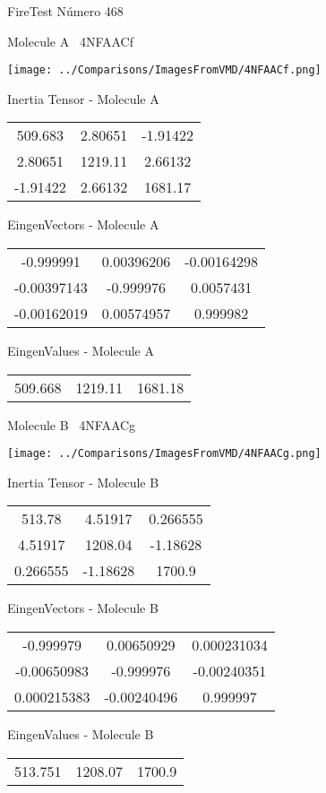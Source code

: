 \vtab[-3cm]
\begin{center}
{\large FireTest \tab Número 468}
\end{center}
\begin{multicols}{2}
\begin{center}

Molecule A \
4NFAACf

\texttt{[image: ../Comparisons/ImagesFromVMD/4NFAACf.png]}

Inertia Tensor - Molecule A \\
\begin{tabular}{|c c c|}
509.683	 & 	2.80651	 & 	-1.91422	 \\
2.80651	 & 	1219.11	 & 	2.66132	 \\
-1.91422	 & 	2.66132	 & 	1681.17
\end{tabular}

\vtab
 EingenVectors - Molecule A     \\
\begin{tabular}{|c c c|}
-0.999991	 & 	0.00396206	 & 	-0.00164298	 \\
-0.00397143	 & 	-0.999976	 & 	0.0057431	 \\
-0.00162019	 & 	0.00574957	 & 	0.999982
\end{tabular}

\vtab
 EingenValues - Molecule A     \\
\begin{tabular}{|c c c|}
509.668	 & 	1219.11	 & 	1681.18	 \\
\end{tabular}
\columnbreak

Molecule B \
4NFAACg

\texttt{[image: ../Comparisons/ImagesFromVMD/4NFAACg.png]}

Inertia Tensor - Molecule B \\
\begin{tabular}{|c c c|}
513.78	 & 	4.51917	 & 	0.266555	 \\
4.51917	 & 	1208.04	 & 	-1.18628	 \\
0.266555	 & 	-1.18628	 & 	1700.9
\end{tabular}

\vtab
 EingenVectors - Molecule B     \\
\begin{tabular}{|c c c|}
-0.999979	 & 	0.00650929	 & 	0.000231034	 \\
-0.00650983	 & 	-0.999976	 & 	-0.00240351	 \\
0.000215383	 & 	-0.00240496	 & 	0.999997
\end{tabular}

\vtab
 EingenValues - Molecule B     \\
\begin{tabular}{|c c c|}
513.751	 & 	1208.07	 & 	1700.9	 \\
\end{tabular}

\end{center}
\end{multicols}

